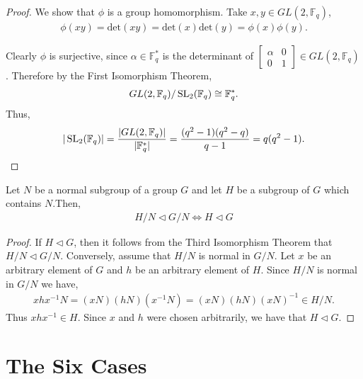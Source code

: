 \begin{proof}
We show that $\phi$ is a group homomorphism. Take $x,y \in GL(2,\mathbb{F}_q)$,
\begin{align*} 
\phi(xy) = \text{det}(xy) = \text{det}(x) \text{det}(y) = \phi(x) \phi(y).
\end{align*}

Clearly $\phi$ is surjective, since $\alpha \in \mathbb{F}^*_q$ is the determinant of $\begin{bmatrix} \alpha & 0 \\ 0 & 1 \end{bmatrix} \in GL(2,\mathbb{F}_q)$. Therefore by the First Isomorphism Theorem,
\begin{align*} GL(2,\mathbb{F}_q) / \operatorname{SL}_2(\mathbb{F}_q) \cong \mathbb{F}^*_q.
\end{align*}
Thus,
\begin{align*} |\operatorname{SL}_2(\mathbb{F}_q)| =  \frac{|GL(2,\mathbb{F}_q)|}{|\mathbb{F}^*_q|} = \frac{(q^2-1)(q^2-q)}{q-1} = q(q^2-1).
\end{align*}

\end{proof}

\begin{lemma}\label{normalquotient} Let $N$ be a normal subgroup of a group $G$ and let $H$ be a subgroup of $G$ which contains $N$.Then,
\begin{align*} H / N \vartriangleleft G / N \iff H \vartriangleleft G
\end{align*} 
\end{lemma}

\begin{proof} If $H \vartriangleleft G$, then it follows from the Third Isomorphism Theorem that $ H / N \vartriangleleft G / N$. Conversely, assume that $H / N$ is normal in $G / N$. Let $x$ be an arbitrary element of $G$ and $h$ be an arbitrary element of $H$. Since $H / N$ is normal in $G / N$ we have,
\begin{align*} x h x^{-1}N = (xN)(hN)(x^{-1}N) = (xN)(hN)(xN)^{-1} \in H / N.
\end{align*}
Thus $x h x^{-1} \in H$. Since $x$ and $h$ were chosen arbitrarily, we have that $H \vartriangleleft G$.

\end{proof}

\section {The Six Cases}

